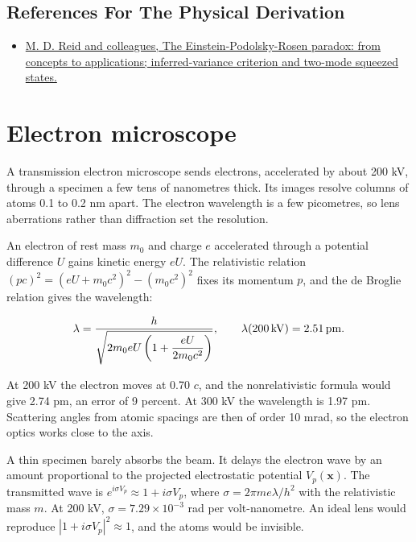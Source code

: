 \documentclass[11pt,oneside]{book}
\newenvironment{centeredalign}{\[\begin{gathered}[c]}{\end{gathered}\]}
\begin{document}
\subsection*{References For The Physical Derivation}
\begin{itemize}
\item \href{https://arxiv.org/abs/0806.0270}{M. D. Reid and colleagues, The Einstein-Podolsky-Rosen paradox: from concepts to applications; inferred-variance criterion and two-mode squeezed states.}
\end{itemize}





\clearpage

\section{Electron microscope}

\label{topic:electron-microscope}

A transmission electron microscope sends electrons, accelerated by about 200 kV, through a specimen a few tens of nanometres thick. Its images resolve columns of atoms 0.1 to 0.2 nm apart. The electron wavelength is a few picometres, so lens aberrations rather than diffraction set the resolution.

An electron of rest mass \(m_0\) and charge \(e\) accelerated through a potential difference \(U\) gains kinetic energy \(eU\). The relativistic relation \((pc)^2=(eU+m_0c^2)^2-(m_0c^2)^2\) fixes its momentum \(p\), and the de Broglie relation gives the wavelength:

\begin{centeredalign}
\lambda=\frac{h}{\sqrt{2m_0eU\left(1+\dfrac{eU}{2m_0c^2}\right)}},\qquad
\lambda(200\,{\rm kV})=2.51\,{\rm pm}.
\end{centeredalign}

At 200 kV the electron moves at 0.70 \(c\), and the nonrelativistic formula would give 2.74 pm, an error of 9 percent. At 300 kV the wavelength is 1.97 pm. Scattering angles from atomic spacings are then of order 10 mrad, so the electron optics works close to the axis.

A thin specimen barely absorbs the beam. It delays the electron wave by an amount proportional to the projected electrostatic potential \(V_p(\mathbf x)\). The transmitted wave is \(e^{i\sigma V_p}\approx1+i\sigma V_p\), where \(\sigma=2\pi me\lambda/h^2\) with the relativistic mass \(m\). At 200 kV, \(\sigma=7.29\times10^{-3}\) rad per volt-nanometre. An ideal lens would reproduce \(|1+i\sigma V_p|^2\approx1\), and the atoms would be invisible.
\end{document}

